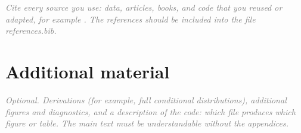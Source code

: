 \documentclass[12pt]{article}
\newcommand{\guide}[1]{\textit{\textcolor{gray}{#1}}}
\begin{document}
\guide{Cite every source you use: data, articles, books, and code that you reused or adapted, for example \cite{robert2004monte,gelman2013bayesian}. The references should be included into the file references.bib.}




\appendix
{}

\section{Additional material}\label{app:additional}

\guide{Optional. Derivations (for example, full conditional distributions), additional figures and diagnostics, and a description of the code: which file produces which figure or table. The main text must be understandable without the appendices.}
\end{document}
